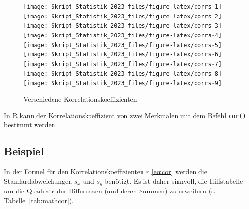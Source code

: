 \documentclass[
  11pt,
  ngerman,
  a4paper,
]{report}
\newenvironment{rtip}{
  \medskip
  \begin{tcolorbox}[colframe=purple,colback=light_gray,title=Softwarehinweis]
}{
  \end{tcolorbox}
  \medskip
}
\begin{document}
\begin{figure}[!h]

{\centering \texttt{[image: Skript\_Statistik\_2023\_files/figure-latex/corrs-1]} \texttt{[image: Skript\_Statistik\_2023\_files/figure-latex/corrs-2]} \texttt{[image: Skript\_Statistik\_2023\_files/figure-latex/corrs-3]} \texttt{[image: Skript\_Statistik\_2023\_files/figure-latex/corrs-4]} \texttt{[image: Skript\_Statistik\_2023\_files/figure-latex/corrs-5]} \texttt{[image: Skript\_Statistik\_2023\_files/figure-latex/corrs-6]} \texttt{[image: Skript\_Statistik\_2023\_files/figure-latex/corrs-7]} \texttt{[image: Skript\_Statistik\_2023\_files/figure-latex/corrs-8]} \texttt{[image: Skript\_Statistik\_2023\_files/figure-latex/corrs-9]} 

}

\caption{Verschiedene Korrelationskoeffizienten}\label{fig:corrs}
\end{figure}

\begin{rtip}
In R kann der Korrelationskoeffizient von zwei Merkmalen mit dem Befehl \verb|cor()| bestimmt werden.
\end{rtip}

\hypertarget{beispiel-25}{%
\subsection{Beispiel}\label{beispiel-25}}

In der Formel für den Korrelationskoeffizienten \(r\) \eqref{eq:cor} werden die Standardabweichungen \(s_x\) und \(s_y\) benötigt. Es ist daher sinnvoll, die Hilfstabelle um die Quadrate der Differenzen (und deren Summen) zu erweitern (s. Tabelle~\ref{tab:mathcor}).
\end{document}
